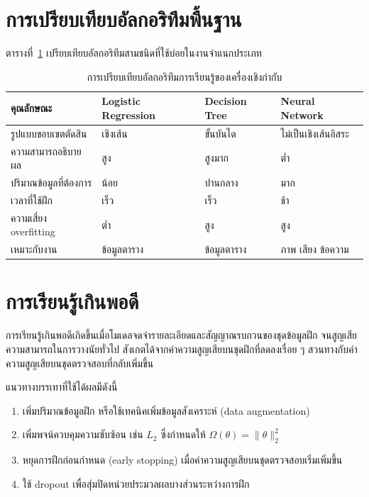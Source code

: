 \documentclass[12pt, a4paper]{article}
\begin{document}
\section{การเปรียบเทียบอัลกอริทึมพื้นฐาน}

ตารางที่~\ref{tab:compare} เปรียบเทียบอัลกอริทึมสามชนิดที่ใช้บ่อยในงานจำแนกประเภท

\begin{table}[H]
\centering
\caption{การเปรียบเทียบอัลกอริทึมการเรียนรู้ของเครื่องเชิงกำกับ}
\label{tab:compare}
\small
\begin{tabular}{@{}llll@{}}
\toprule
\textbf{คุณลักษณะ} & \textbf{Logistic Regression} & \textbf{Decision Tree} & \textbf{Neural Network} \\
\midrule
รูปแบบขอบเขตตัดสิน & เชิงเส้น         & ขั้นบันได         & ไม่เป็นเชิงเส้นอิสระ \\
ความสามารถอธิบายผล & สูง               & สูงมาก            & ต่ำ \\
ปริมาณข้อมูลที่ต้องการ & น้อย           & ปานกลาง           & มาก \\
เวลาที่ใช้ฝึก        & เร็ว              & เร็ว               & ช้า \\
ความเสี่ยง overfitting & ต่ำ            & สูง                & สูง \\
เหมาะกับงาน          & ข้อมูลตาราง       & ข้อมูลตาราง        & ภาพ เสียง ข้อความ \\
\bottomrule
\end{tabular}
\end{table}

\section{การเรียนรู้เกินพอดี}

การเรียนรู้เกินพอดีเกิดขึ้นเมื่อโมเดลจดจำรายละเอียดและสัญญาณรบกวนของชุดข้อมูลฝึก
จนสูญเสียความสามารถในการวางนัยทั่วไป สังเกตได้จากค่าความสูญเสียบนชุดฝึกที่ลดลงเรื่อย ๆ
สวนทางกับค่าความสูญเสียบนชุดตรวจสอบที่กลับเพิ่มขึ้น

แนวทางบรรเทาที่ใช้ได้ผลมีดังนี้

\begin{enumerate}[leftmargin=2em, itemsep=0.2em]
  \item เพิ่มปริมาณข้อมูลฝึก หรือใช้เทคนิคเพิ่มข้อมูลสังเคราะห์ (data augmentation)
  \item เพิ่มพจน์ควบคุมความซับซ้อน เช่น $L_{2}$ ซึ่งกำหนดให้ $\Omega(\theta) = \lVert \theta \rVert_{2}^{2}$
  \item หยุดการฝึกก่อนกำหนด (early stopping) เมื่อค่าความสูญเสียบนชุดตรวจสอบเริ่มเพิ่มขึ้น
  \item ใช้ dropout เพื่อสุ่มปิดหน่วยประมวลผลบางส่วนระหว่างการฝึก
\end{enumerate}
\end{document}
